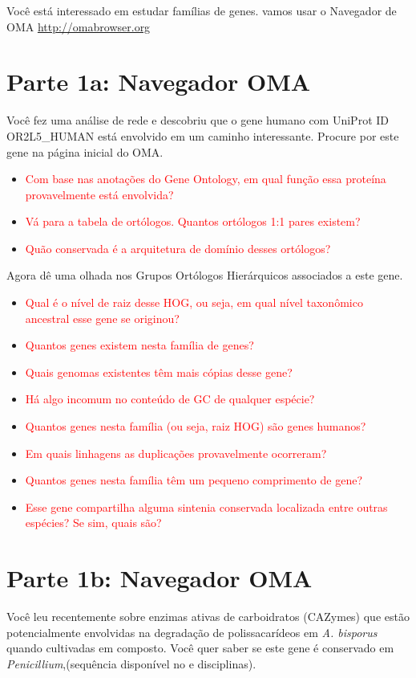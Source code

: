 \documentclass[letter,11pt]{book}
\begin{document}
Você está interessado em estudar famílias de genes. vamos usar o Navegador de OMA \url{http://omabrowser.org}

\section{Parte 1a: Navegador OMA}

Você fez uma análise de rede e descobriu que o gene humano com UniProt ID OR2L5\_HUMAN está envolvido em um caminho interessante. Procure por este gene na página inicial do OMA.
\begin{itemize}
\item \textcolor{red}{Com base nas anotações do Gene Ontology, em qual função essa proteína provavelmente está envolvida?}
\item \textcolor{red}{Vá para a tabela de ortólogos. Quantos ortólogos 1:1 pares existem?}
\item \textcolor{red}{Quão conservada é a arquitetura de domínio desses ortólogos?}
\end{itemize}
Agora dê uma olhada nos Grupos Ortólogos Hierárquicos associados a este gene.  
\begin{itemize}
\item \textcolor{red}{Qual é o nível de raiz desse HOG, ou seja, em qual nível taxonômico ancestral esse gene se originou?}
\item \textcolor{red}{Quantos genes existem nesta família de genes?}
\item \textcolor{red}{Quais genomas existentes têm mais cópias desse gene?}
\item \textcolor{red}{Há algo incomum no conteúdo de GC de qualquer espécie?}
\item \textcolor{red}{Quantos genes nesta família (ou seja, raiz HOG) são genes humanos?}
\item \textcolor{red}{Em quais linhagens as duplicações provavelmente ocorreram?}
\item \textcolor{red}{Quantos genes nesta família têm um pequeno comprimento de gene?}
\end{itemize}
\begin{itemize}
\item \textcolor{red}{Esse gene compartilha alguma sintenia conservada localizada entre outras espécies? Se sim, quais são?}
\end{itemize}
\section{Parte 1b: Navegador OMA}
Você leu recentemente sobre enzimas ativas de carboidratos (CAZymes) que estão potencialmente envolvidas na degradação de polissacarídeos em \textit{A. bisporus} quando cultivadas em composto. Você quer saber se este gene é conservado em \textit{Penicillium},(sequência disponível no e disciplinas).
\end{document}
